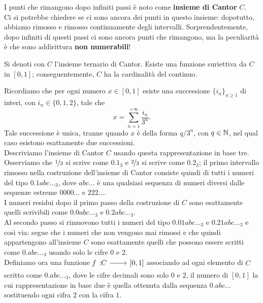 I punti che rimangono dopo infiniti passi è noto come \textbf{insieme di Cantor} $C$.\\
Ci si potrebbe chiedere se ci sono ancora dei punti in questo insieme: dopotutto, abbiamo rimosso e rimosso continuamente degli intervalli. Sorprendentemente, dopo infiniti di questi passi ci sono ancora punti che rimangono, ma la peculiarità è che sono addirittura \textbf{non numerabili}!
\begin{theorema}
	Si denoti con $C$ l'insieme ternario di Cantor. Esiste una funzione suriettiva da $C$ in $\left[0,1\right]$; conseguentemente, $C$ ha la cardinalità del continuo.
\end{theorema}
\begin{demonstration}
	Ricordiamo che per ogni numero $x\in [0,1]$ esiste una successione $\{i_n\}_{n\geq 1}$ di interi, con $i_n\in \{0, 1, 2\}$, tale che 
	\begin{equation*}
		x=\sum_{n=1}^{+\infty} \dfrac{i_n}{3^n}. 
	\end{equation*}
	Tale successione è unica, tranne quando $x$ è della forma $q/3^n$, con  $q\in \mathbb{N}$, nel qual caso esistono esattamente due successioni.\\
	Descriviamo l'insieme di Cantor $C$ usando questa rappresentazione in base tre.\\
	Osserviamo che $\nicefrac{1}{3}$ si scrive come $0.1_3$ e $\nicefrac{2}{3}$ si scrive come $0.2_3$; il primo intervallo rimosso nella costruzione dell'insieme di Cantor consiste quindi di tutti i numeri del tipo $0.1abc\ldots_3$, dove $abc\ldots$ è una qualsiasi sequenza di numeri diversi dalle sequenze estreme $0000\ldots$ e $222\ldots$.\\
	I numeri residui dopo il primo passo della costruzione di $C$ sono esattamente quelli scrivibili come $0.0abc\ldots_3$ e $0.2abc\ldots_3$.\\
	Al secondo passo si rimuovono tutti i numeri del tipo $0.01abc\ldots_3$ e $0.21abc\ldots_3$ e così via: segue che i numeri che non vengono mai rimossi e che quindi appartengono all'insieme $C$ sono esattamente quelli che possono essere scritti come $0.abc\ldots_3$ usando solo le cifre $0$ e $2$.\\
	Definiamo ora una funzione $\funz{f}{C}{\left[0,1\right]}$ associando ad ogni elemento di $C$ scritto come $0.abc\ldots_3$, dove le cifre decimali sono solo $0$ e $2$, il numero di $\left[0,1\right]$ la cui rappresentazione in base due è quella ottenuta dalla sequenza $0.abc\ldots$ sostituendo ogni cifra $2$ con la cifra $1$.\\

\end{demonstration}
